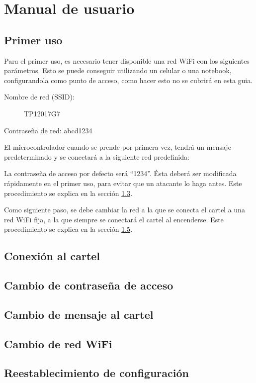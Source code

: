 \section{Manual de usuario} \label{sec:manual-usuario}

\subsection{Primer uso}
Para el primer uso, es necesario tener disponible una red WiFi con los siguientes parámetros. Esto se puede conseguir utilizando un celular o una notebook, configurandola como punto de acceso, como hacer esto no se cubrirá en esta guia.

\begin{description}
	\item[Nombre de red (SSID): ] TP12017G7
	\item[Contraseña de red: abcd1234]
\end{description}

El microcontrolador cuando se prende por primera vez, tendrá un mensaje predeterminado y se conectará a la siguiente red predefinida:

La contraseña de acceso por defecto será \enquote{1234}. Ésta deberá ser modificada rápidamente en el primer uso, para evitar que un atacante lo haga antes. Este procedimiento se explica en la sección \ref{sec:guia-password}.

Como siguiente paso, se debe cambiar la red a la que se conecta el cartel a una red WiFi fija, a la que siempre se conectará el cartel al encenderse. Este procedimiento se explica en la sección \ref{sec:guia-wifi}.


\subsection{Conexión al cartel}\label{sec:guia-conexion}

\subsection{Cambio de contraseña de acceso}\label{sec:guia-password}

\subsection{Cambio de mensaje al cartel}\label{sec:guia-texto}

\subsection{Cambio de red WiFi}\label{sec:guia-wifi}

\subsection{Reestablecimiento de configuración}\label{sec:guia-reset}
